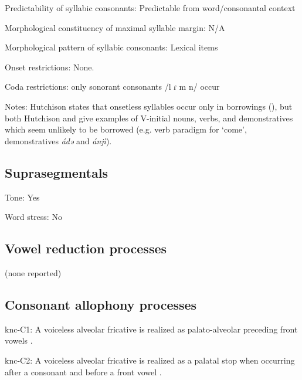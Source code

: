 {\begin{appendixdesc}
\item[Predictability of syllabic consonants:] Predictable from word/consonantal context

\item[Morphological constituency of maximal syllable margin:] N/A

\item[Morphological pattern of syllabic consonants:] Lexical items

\item[Onset restrictions:] None.

\item[Coda restrictions:] only sonorant consonants /l ɾ m n/ occur \citep[15]{Hutchison1981}

\item[Notes:] Hutchison states that onsetless syllables occur only in borrowings (\citeyear[15]{Hutchison1981}), but both Hutchison and \citet{Cyffer1998} give examples of V-initial nouns, verbs, and demonstratives which seem unlikely to be borrowed (e.g. verb paradigm for ‘come’, demonstratives \textit{ádə} and \textit{ánjì}).
\end{appendixdesc}
\subsection*{Suprasegmentals}
\begin{appendixdesc}
\item[Tone:] Yes

\item[Word stress:] No
\end{appendixdesc}
\subsection*{Vowel reduction processes}

(none reported)
\subsection*{Consonant allophony processes}
\begin{appendixdesc}

\item[knc-C1:] A voiceless alveolar fricative is realized as palato-alveolar preceding front vowels \citep[20]{Cyffer1998}.

\item[knc-C2:] A voiceless alveolar fricative is realized as a palatal stop when occurring after a consonant and before a front vowel \citep[21]{Cyffer1998}.


\end{appendixdesc}}
